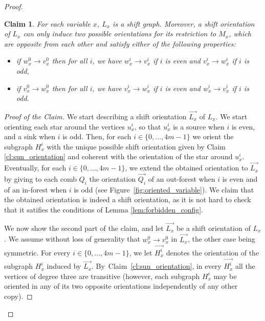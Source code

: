 \documentclass[11pt,a4aper]{article}
\newtheorem{claim}[theorem]{Claim}
\newenvironment{poc}{\begin{proof}[Proof of the
    Claim]\renewcommand*{\qedsymbol}{$\blacksquare$}}{\end{proof}}
\DeclareRobustCommand*{\ora}{\overrightarrow}
\newcommand*{\orHxi}{\ora{H_x^i}}
\newcommand*{\orLx}{\ora{L_x}}
\begin{document}
\begin{proof}
  \begin{claim}\label{cl:gadget_orientation}
  For each variable $x$, $L_x$ is a shift graph. Moreover, a shift orientation of $L_x$ can only induce two  
%   
    possible
    orientations for its restriction to $M_x$, which are opposite from each
    other and satisfy either of the following properties:
    \begin{itemize}
     \item if $w_x^0 \to v_x^0$ then for all $i$, we have $w_x^{i} \to v_x^{i}$ if $i$
    is even and $v_x^{i} \to w_x^{i}$ if $i$ is odd,
    \item if $v_x^0 \to w_x^0$ then for all $i$, we have $v_x^{i} \to w_x^{i}$ if $i$
    is even and $w_x^{i} \to v_x^{i}$ if $i$ is odd.
    \end{itemize}
  \end{claim}
  \begin{poc}
  We start describing a shift orientation $\orLx$ of $L_x$. 
  We start orienting each star around the vertices $u_x^i$, so that $u_x^i$ is a source when $i$ is even, and a sink when $i$ is odd. Then, for each $i\in \{0, \ldots,4m-1\}$ we orient the subgraph $H^i_x$ with the unique possible shift orientation given by Claim \ref{cl:sun_orientation} and coherent with the orientation of the star around $u_x^i$. Eventually, for each $i\in \{0,\ldots,4m-1\}$, we extend the obtained orientation to $\orLx$ by giving to each comb $Q_i$ the orientation $\ora{Q_i}$ of an out-forest when $i$ is even and of an in-forest when $i$ is odd (see Figure~\ref{fig:oriented_variable}). We claim that the obtained orientation is indeed a shift orientation, as it is not hard to check that it satifies the conditions of Lemma \ref{lem:forbidden_config}.
  
  
  We now show the second part of the claim, and let $\orLx$ be a shift orientation of $L_x$. We assume without loss of generality that $w_x^0 \to v_x^0$ in $\orLx$, the other case being symmetric.
    For every $i\in \{0,\ldots,4m-1\}$, we let $\orHxi$ denotes the orientation of the subgraph $H_x^i$ induced by $\orLx$.
    By~Claim~\ref{cl:sun_orientation}, in every $\orHxi$ all the vertices of degree three are transitive (however,
    each subgraph $H_x^i$ may be oriented in any of its two opposite
    orientations independently of any other copy).


\end{poc}
\end{proof}
\end{document}
